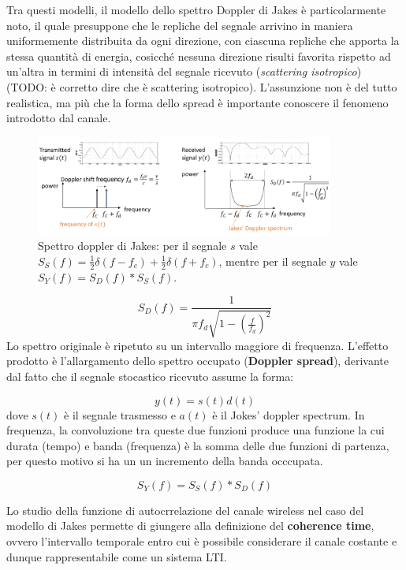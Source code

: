 Tra questi modelli, il modello dello spettro Doppler di Jakes è particolarmente noto, il quale presuppone che le repliche del segnale arrivino in maniera uniformemente distribuita da ogni direzione, con ciascuna repliche che apporta la stessa quantità di energia, cosicché nessuna direzione risulti favorita rispetto ad un'altra in termini di intensità del segnale ricevuto (\textit{scattering isotropico}) (TODO: è corretto dire che è scattering isotropico).
L'assunzione non è del tutto realistica, ma più che la forma dello spread è importante conoscere il fenomeno introdotto dal canale.

\begin{figure}[ht]
    \centering
    \includegraphics[width=0.875\textwidth]{imgs/jakes.jpg}
    \captionsetup{width=.5\textwidth}
    \caption*{Spettro doppler di Jakes:
        per il segnale $s$ vale \( S_S(f) = \frac{1}{2} \delta \left(f - f_c \right) + \frac{1}{2} \delta \left(f + f_c\right) \), 
        mentre per il segnale $y$ vale \( S_Y(f) = S_D(f) \ast S_S(f) \).
    }
\end{figure}

\[
  S_D(f) = \frac{1}{\pi f_d \sqrt{1 - \left(\frac{f}{f_d}\right)^2}}
\]
Lo spettro originale è ripetuto su un intervallo maggiore di frequenza. L'effetto prodotto è l'allargamento dello spettro occupato (\textbf{Doppler spread}), derivante dal fatto che il segnale stocastico ricevuto assume la forma:

\[
    y(t) = s(t) d(t)
\]
dove $s(t)$ è il segnale trasmesso e $a(t)$ è il Jokes' doppler spectrum. In frequenza, la convoluzione tra queste due funzioni produce una funzione la cui durata (tempo) e banda (frequenza) è la somma delle due funzioni di partenza, per questo motivo si ha un un incremento della banda occcupata.

\[
    S_Y(f) = S_S(f) \ast S_D(f) 
\]

Lo studio della funzione di autocrrelazione del canale wireless nel caso del modello di Jakes permette di giungere alla definizione del \textbf{coherence time}, ovvero l'intervallo temporale entro cui è possibile considerare il canale costante e dunque rappresentabile come un sistema LTI.


